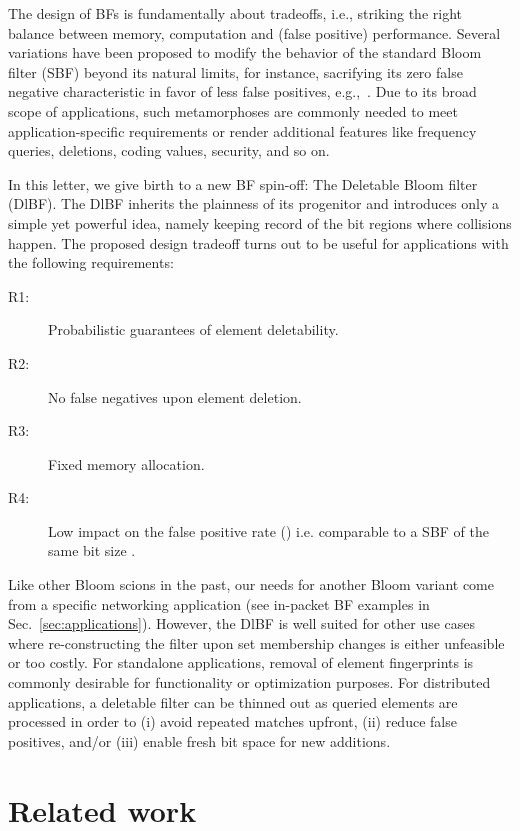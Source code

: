 \documentclass[conference]{IEEEtran}
\begin{document}
The design of BFs is fundamentally about tradeoffs, i.e., striking the right balance between memory, computation and (false positive) performance. 
Several variations have been proposed to modify the behavior of the standard Bloom filter (SBF) beyond its natural limits, 
for instance, sacrifying its zero false negative characteristic in favor of less false positives, e.g.,~\cite{1368454}. Due to its broad scope of applications, such metamorphoses are commonly needed to meet application-specific requirements or render additional features like frequency queries, deletions, coding values, security, and so on.

In this letter, we give birth to a new BF spin-off: The Deletable Bloom filter (DlBF). The DlBF inherits the plainness of its progenitor and introduces only a simple yet powerful idea, namely keeping record of the bit regions where collisions happen. The proposed design tradeoff turns out to be useful for applications with the following requirements:

\begin{description}
\item[R1:] Probabilistic guarantees of element deletability.
\item[R2:] No false negatives upon element deletion.
\item[R3:] Fixed memory allocation. \item[R4:] Low impact on the false positive rate () i.e. comparable to a SBF of the same bit size . \end{description}





Like other Bloom scions in the past, our needs for another Bloom variant come from a specific networking application (see in-packet BF examples in Sec.~\ref{sec:applications}).  
However, the DlBF is well suited for other use cases where re-constructing the filter upon set membership changes is either unfeasible or too costly.
For standalone applications, removal of element fingerprints is commonly desirable for functionality or optimization purposes.
For distributed applications, a deletable filter can be thinned out as queried elements are processed in order to 
(i) avoid repeated matches upfront, 
(ii) reduce false positives, 
and/or (iii) enable fresh bit space for new additions.


\section{Related work}
\label{sec:related}
\end{document}
